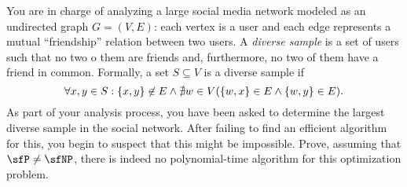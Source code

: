 
\def \diverse { \textsc{Diverse} }
\def \indset { \textsc{IndSet} }
\begin{problem}
  You are in charge of analyzing a large social media network modeled as an
  undirected graph $G = (V, E)$: each vertex is a user and each edge
  represents a mutual ``friendship'' relation between two users.
  A \emph{diverse sample} is a set of users such that no two o them are friends
  and, furthermore, no two of them have a friend in common. Formally, a set
  $S \subseteq V$ is a diverse sample if
  \[ 
    \forall x, y \in S : \left\{x, y\right\} \not\in E \land \nexists w \in V
    ( \left\{w, x\right\} \in E \land \left\{w, y\right\} \in E).
  \]
  As part of your analysis process, you have been asked to determine the largest
  diverse sample in the social network. After failing to find an efficient algorithm
  for this, you begin to suspect that this might be impossible.
  Prove, assuming that $\sfP \neq \sfNP$, there is indeed no polynomial-time
  algorithm for this optimization problem.
\end{problem}

